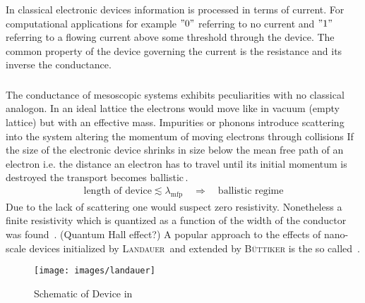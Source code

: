 In classical electronic devices information is processed in terms of current. For computational applications for example $"0"$ referring to no current and $"1"$ referring to a flowing current above some threshold through the device. The common property of the device governing the current is the resistance and its inverse the conductance.
\subsubsection{\clanbform{}}
The conductance of mesoscopic systems exhibits peculiarities with no classical analogon.  
In an ideal lattice the electrons would move like in vacuum (empty lattice) but with an effective mass. Impurities or phonons introduce scattering into the system altering the momentum of moving electrons through collisions
If the size of the electronic device shrinks in size below the mean free path of an electron i.e. the distance an electron has to travel until its initial momentum is destroyed the transport becomes ballistic\,\cite{datta1989quantum}. 
\begin{align}
	\text{length of device} \lesssim \lambda_{\text{mfp}}\quad \Rightarrow \quad\text{ballistic regime}
	\label{eqn:meanfreepath}
\end{align}
Due to the lack of scattering one would suspect zero resistivity. Nonetheless a finite resistivity which is quantized as a function of the width of the conductor was found \,\cite{PhysRevLett.60.848}.
(Quantum Hall effect?)
A popular approach to the effects of nano-scale devices initialized by \textsc{Landauer}\,\cite{PhilMag.21.863} and extended by \textsc{B\"uttiker} is the so called \lanbform{}\,\cite{PhysRevB.31.6207}.  
\begin{figure}[h]
\centering
\texttt{[image: images/landauer]} 
\caption{Schematic of Device in \lanbform{}}
\label{fig:lanbform}
\end{figure}

